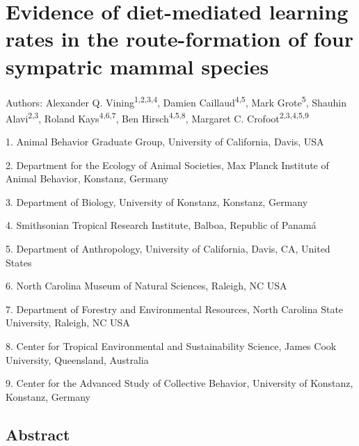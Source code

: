 \documentclass[twoside,12pt,final]{ucthesis-CA2012}
\begin{document}
\begin{ucmainmatter}
\hypertarget{route-learn}{%
\chapter{Evidence of diet-mediated learning rates in the route-formation of four sympatric mammal species}\label{route-learn}}


Authors: Alexander Q. Vining\textsuperscript{1,2,3,4}, Damien Caillaud\textsuperscript{4,5}, Mark Grote\textsuperscript{5}, Shauhin Alavi\textsuperscript{2,3}, Roland Kays\textsuperscript{4,6,7}, Ben Hirsch\textsuperscript{4,5,8}, Margaret C. Crofoot\textsuperscript{2,3,4,5,9}

\par
\begin{scriptsize}
1.  Animal Behavior Graduate Group, University of California, Davis, USA

2.  Department for the Ecology of Animal Societies, Max Planck Institute of Animal Behavior, Konstanz, Germany

3.  Department of Biology, University of Konstanz, Konstanz, Germany

4.  Smithsonian Tropical Research Institute, Balboa, Republic of Panamá

5.  Department of Anthropology, University of California, Davis, CA, United States

6.  North Carolina Museum of Natural Sciences, Raleigh, NC USA

7.  Department of Forestry and Environmental Resources, North Carolina State University, Raleigh, NC USA

8.  Center for Tropical Environmental and Sustainability Science, James Cook University, Queensland, Australia

9.  Center for the Advanced Study of Collective Behavior, University of Konstanz, Konstanz, Germany


\par
\end{scriptsize}
\hypertarget{abstract-3}{%
\section{Abstract}\label{abstract-3}}


\end{ucmainmatter}
\end{document}
